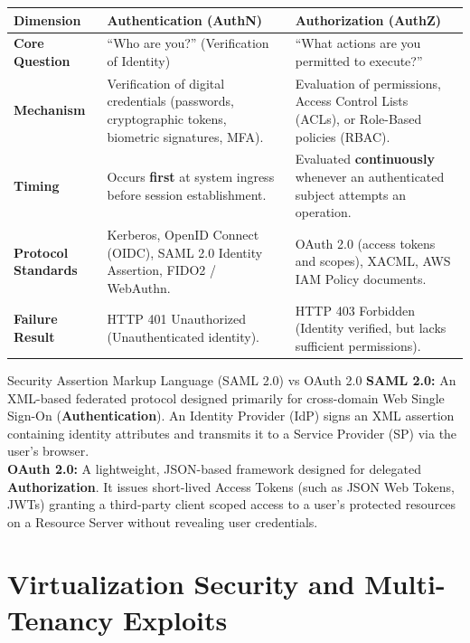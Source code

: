 \documentclass[11pt,a4paper,openany]{report}
\begin{document}
\begin{center}
\begin{tabularx}{\textwidth}{>{\bfseries}l p{6.5cm} X}
\toprule
Dimension & Authentication (AuthN) & Authorization (AuthZ)\\
\midrule
Core Question & ``Who are you?'' (Verification of Identity) & ``What actions are you permitted to execute?''\\
Mechanism & Verification of digital credentials (passwords, cryptographic tokens, biometric signatures, MFA). & Evaluation of permissions, Access Control Lists (ACLs), or Role-Based policies (RBAC).\\
Timing & Occurs \textbf{first} at system ingress before session establishment. & Evaluated \textbf{continuously} whenever an authenticated subject attempts an operation.\\
Protocol Standards & Kerberos, OpenID Connect (OIDC), SAML 2.0 Identity Assertion, FIDO2 / WebAuthn. & OAuth 2.0 (access tokens and scopes), XACML, AWS IAM Policy documents.\\
Failure Result & HTTP 401 Unauthorized (Unauthenticated identity). & HTTP 403 Forbidden (Identity verified, but lacks sufficient permissions).\\
\bottomrule
\end{tabularx}
\end{center}

\begin{defbox}{Security Assertion Markup Language (SAML 2.0) vs OAuth 2.0}
\textbf{SAML 2.0:} An XML-based federated protocol designed primarily for cross-domain Web Single Sign-On (\textbf{Authentication}). An Identity Provider (IdP) signs an XML assertion containing identity attributes and transmits it to a Service Provider (SP) via the user's browser.\\
\textbf{OAuth 2.0:} A lightweight, JSON-based framework designed for delegated \textbf{Authorization}. It issues short-lived Access Tokens (such as JSON Web Tokens, JWTs) granting a third-party client scoped access to a user's protected resources on a Resource Server without revealing user credentials.
\end{defbox}

\section{Virtualization Security and Multi-Tenancy Exploits}
\end{document}
